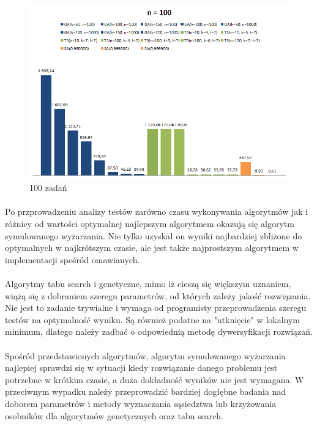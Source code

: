 \documentclass[wide,a4paper,titlepage,12pt] {article}
\begin{document}
\begin{landscape}
\begin{figure}[htbp]
  \begin{center}
         \includegraphics[scale = 1.0]{img/all100.PNG}
         \caption{100 zadań}
  \end{center}
\end{figure}
\end{landscape}


\paragraph{}
Po przprowadzeniu analizy testów zarówno czasu wykonywania algorytmów jak i różnicy od wartości optymalnej najlepszym algorytmem okazują się algorytm symulowanego wyżarzania. Nie tylko uzyskał on wyniki najbardziej zbliżone do optymalnych w najkrótszym czasie, ale jest także najprostszym algorytmem w implementacji spośród omawianych.

\paragraph{}
Algorytmy tabu search i genetyczne, mimo iż cieszą się większym uznaniem, wiążą się z dobraniem szeregu parametrów, od których zależy jakość rozwiązania. Nie jest to zadanie trywialne i wymaga od programisty przeprowadzenia szeregu testów na optymalność wyniku. Są również podatne na "utknięcie" w lokalnym minimum, dlatego należy zadbać o odpowiednią metodę dywersyfikacji rozwiązań.

\paragraph{}
Spośród przedstawionych algorytmów, algorytm symulowanego wyżarzania najlepiej sprawdzi się w sytuacji kiedy rozwiązanie danego problemu jest potrzebne w krótkim czasie, a duża dokładność wyników nie jest wymagana. W przeciwnym wypadku należy przeprowadzić bardziej dogłębne badania nad doborem parametrów i metody wyznaczania sąsiedztwa lub krzyżowania osobników dla algorytmów genetycznych oraz tabu search.
\end{document}
